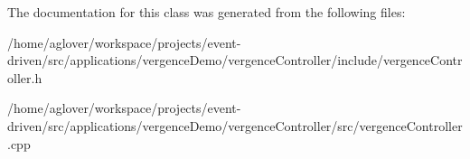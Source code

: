 The documentation for this class was generated from the following files\+:\begin{DoxyCompactItemize}
\item 
/home/aglover/workspace/projects/event-\/driven/src/applications/vergence\+Demo/vergence\+Controller/include/vergence\+Controller.\+h\item 
/home/aglover/workspace/projects/event-\/driven/src/applications/vergence\+Demo/vergence\+Controller/src/vergence\+Controller.\+cpp\end{DoxyCompactItemize}
